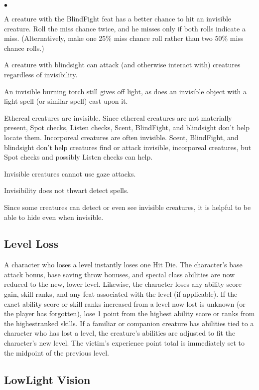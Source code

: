 \begin{list}{$\bullet$}{\itemspace}
	\item A creature with the Blind\textendash Fight feat has a better chance to hit an invisible creature. Roll the miss chance twice, and he misses only if both rolls indicate a miss. (Alternatively, make one 25\% miss chance roll rather than two 50\% miss chance rolls.)
	\item A creature with blindsight can attack (and otherwise interact with) creatures regardless of invisibility.
	\item An invisible burning torch still gives off light, as does an invisible object with a light spell (or similar spell) cast upon it.
	\item Ethereal creatures are invisible. Since ethereal creatures are not materially present, Spot checks, Listen checks, Scent, Blind\textendash Fight, and blindsight don't help locate them. Incorporeal creatures are often invisible. Scent, Blind\textendash Fight, and blindsight don't help creatures find or attack invisible, incorporeal creatures, but Spot checks and possibly Listen checks can help.
	\item Invisible creatures cannot use gaze attacks.
	\item Invisibility does not thwart detect spells.
	\item Since some creatures can detect or even see invisible creatures, it is helpful to be able to hide even when invisible.
\end{list}

\subsection{Level Loss}

A character who loses a level instantly loses one Hit Die. The character's base attack bonus, base saving throw bonuses, and special class abilities are now reduced to the new, lower level. Likewise, the character loses any ability score gain, skill ranks, and any feat associated with the level (if applicable). If the exact ability score or skill ranks increased from a level now lost is unknown (or the player has forgotten), lose 1 point from the highest ability score or ranks from the highest\textendash ranked skills. If a familiar or companion creature has abilities tied to a character who has lost a level, the creature's abilities are adjusted to fit the character's new level. The victim's experience point total is immediately set to the midpoint of the previous level.

\subsection{Low\textendash Light Vision}

